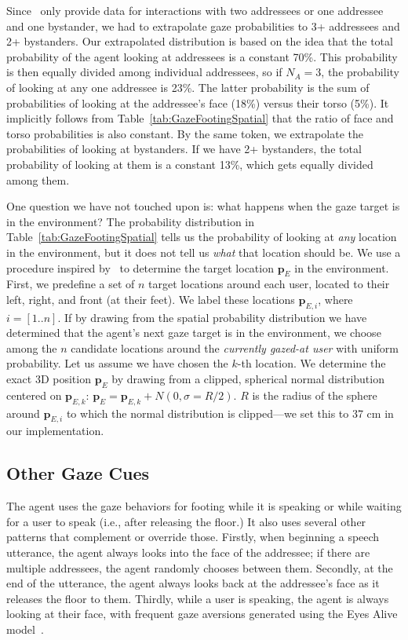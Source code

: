 Since~\citet{mutlu2012conversational} only provide data for interactions with two addressees or one addressee and one bystander, we had to extrapolate gaze probabilities to 3+ addressees and 2+ bystanders. Our extrapolated distribution is based on the idea that the total probability of the agent looking at addressees is a constant 70\%. This probability is then equally divided among individual addressees, so if $N_A = 3$, the probability of looking at any one addressee is 23\%. The latter probability is the sum of probabilities of looking at the addressee's face (18\%) versus their torso (5\%). It implicitly follows from Table~\ref{tab:GazeFootingSpatial} that the ratio of face and torso probabilities is also constant. By the same token, we extrapolate the probabilities of looking at bystanders. If we have 2+ bystanders, the total probability of looking at them is a constant 13\%, which gets equally divided among them.

One question we have not touched upon is: what happens when the gaze target is in the environment? The probability distribution in Table~\ref{tab:GazeFootingSpatial} tells us the probability of looking at \emph{any} location in the environment, but it does not tell us \emph{what} that location should be. We use a procedure inspired by~\citet{mutlu2012conversational} to determine the target location $\mathbf{p}_E$ in the environment. First, we predefine a set of $n$ target locations around each user, located to their left, right, and front (at their feet). We label these locations $\mathbf{p}_{E,i}$, where $i = [1..n]$. If by drawing from the spatial probability distribution we have determined that the agent's next gaze target is in the environment, we choose among the $n$ candidate locations around the \emph{currently gazed-at user} with uniform probability. Let us assume we have chosen the $k$-th location. We determine the exact 3D position $\mathbf{p}_E$ by drawing from a clipped, spherical normal distribution centered on $\mathbf{p}_{E,k}$: $\mathbf{p}_E = \mathbf{p}_{E,k} + N(0, \sigma = R/2)$. $R$ is the radius of the sphere around $\mathbf{p}_{E,i}$ to which the normal distribution is clipped---we set this to 37 cm in our implementation.

\subsection{Other Gaze Cues}

The agent uses the gaze behaviors for footing while it is speaking or while waiting for a user to speak (i.e., after releasing the floor.) It also uses several other patterns that complement or override those. Firstly, when beginning a speech utterance, the agent always looks into the face of the addressee; if there are multiple addressees, the agent randomly chooses between them. Secondly, at the end of the utterance, the agent always looks back at the addressee's face as it releases the floor to them. Thirdly, while a user is speaking, the agent is always looking at their face, with frequent gaze aversions generated using the Eyes Alive model~\citep{lee2002eyes}. 